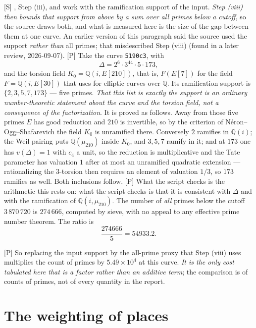 \documentclass[11pt]{article}
\theoremstyle{plain}
\theoremstyle{definition}
\begin{document}
\textup{[S]} \cite[Thm.~1.10]{IUT4}, Step (iii), and \cite[Rem.~1.10.5(iii)]{IUT4} work
with the ramification support of the input.  \emph{Step (viii) then bounds that support
from above by a sum over all primes below a cutoff}, so the source draws both, and what
is measured here is the size of the gap between them at one curve.  An earlier version
of this paragraph said the source used the support \emph{rather than} all primes; that
misdescribed Step (viii) (found in a later review, 2026-09-07).  \textup{[P]} Take the curve
\texttt{5190c3}, with
\[
 \Delta = 2^{6}\cdot3^{44}\cdot5\cdot173 ,
\]
and the torsion field $K_0=\mathbb{Q}(i,E[210])$, that is, $F(E[7])$ for the field
$F=\mathbb{Q}(i,E[30])$ that \cite[\S\S2.10--2.11]{DH25} uses for elliptic curves over
$\mathbb{Q}$.  Its ramification support is
$\{2,3,5,7,173\}$ --- five primes.  \emph{That this list is exactly the support is an
ordinary number-theoretic statement about the curve and the torsion field, not a
consequence of the factorization}.  It is proved as follows.  Away from those five
primes $E$ has good reduction and $210$ is invertible, so by the criterion of
N\'eron--Ogg--Shafarevich the field $K_0$ is unramified there.  Conversely $2$ ramifies
in $\mathbb{Q}(i)$; the Weil pairing puts $\mathbb{Q}(\mu_{210})$ inside $K_0$, and
$3,5,7$ ramify in it; and at $173$ one has $v(\Delta)=1$ with $c_4$ a unit, so the
reduction is multiplicative and the Tate parameter has valuation $1$ after at most an
unramified quadratic extension --- rationalizing the $3$-torsion then requires an
element of valuation $1/3$, so $173$ ramifies as well.  Both inclusions follow.
\textup{[P]} What the script checks is the arithmetic this rests on: what the script checks is that it is
consistent with $\Delta$ and with the ramification of $\mathbb{Q}(i,\mu_{210})$.  The number of \emph{all} primes below the cutoff
$3\,870\,720$ is $274\,666$, computed by sieve, with no appeal to any effective prime
number theorem.  The ratio is
\[
  \frac{274666}{5}=54933.2 .
\]

\textup{[P]} So replacing the input support by the all-prime proxy that Step (viii)
uses multiplies the count of primes by $5.49\times10^{4}$ at this curve.  \emph{It is the only cost
tabulated here that is a factor rather than an additive term}; the comparison is of
counts of primes, not of every quantity in the report.

\section{The weighting of places}\label{s:wt}
\end{document}
